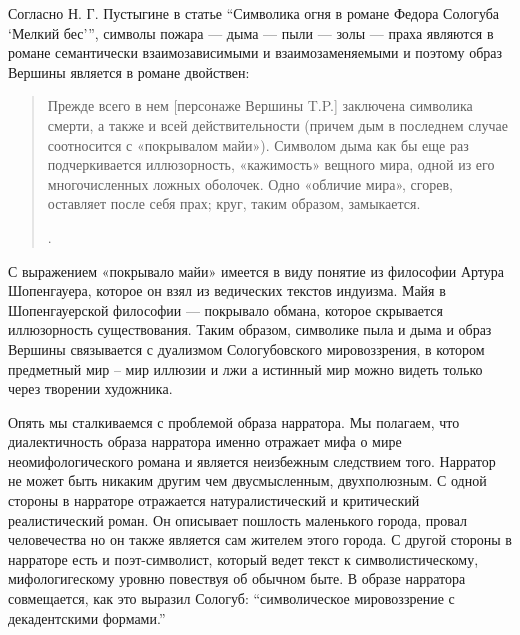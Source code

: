 \documentclass[12pt,a4paper]{article}
\begin{document}
Согласно Н. Г. Пустыгине в статье \enquote{Символика огня в романе Федора Сологуба \enquote{Мелкий бес}}, символы пожара — дыма — пыли — золы — праха являются в романе семантически взаимозависимыми и взаимозаменяемыми и поэтому образ Вершины является в романе двойствен:

\begin{quote}
Прежде всего в нем [персонаже Вершины T.P.] заключена символика смерти, а также и всей действительности (причем дым в последнем случае соотносится с «покрывалом майи»). Символом дыма как бы еще раз подчеркивается иллюзорность, «кажимость» вещного мира, одной из его многочисленных ложных оболочек. Одно «обличие мира», сгорев, оставляет после себя прах; круг, таким образом, замыкается.

\parencite{pustygina1989}.
\end{quote}

С выражением «покрывало майи» имеется в виду понятие из философии Артура Шопенгауера, которое он взял из ведических текстов индуизма. Майя в Шопенгауерской философии — покрывало обмана, которое скрывается иллюзорность существования. Таким образом, символике пыла и дыма и образ Вершины связывается с дуализмом Сологубовского мировоззрения, в котором  предметный мир – мир иллюзии и лжи а истинный мир можно видеть только через творении художника.

Опять мы сталкиваемся с проблемой образа нарратора. Мы полагаем, что диалектичность образа нарратора именно отражает мифа о мире неомифологического романа и является неизбежным следствием того. Нарратор не может быть никаким другим чем двусмысленным, двухполюзным. С одной стороны в нарраторе отражается натуралистический и критический реалистический роман. Он описывает пошлость маленького города, провал человечества но он также является сам жителем этого города. С другой стороны в нарраторе есть и поэт-символист, который ведет текст к символистическому, мифологигескому уровню повествуя об обычном быте. В образе нарратора совмещается, как это выразил Сологуб: \enquote{символическое мировоззрение с декадентскими формами.}



\end{document}
